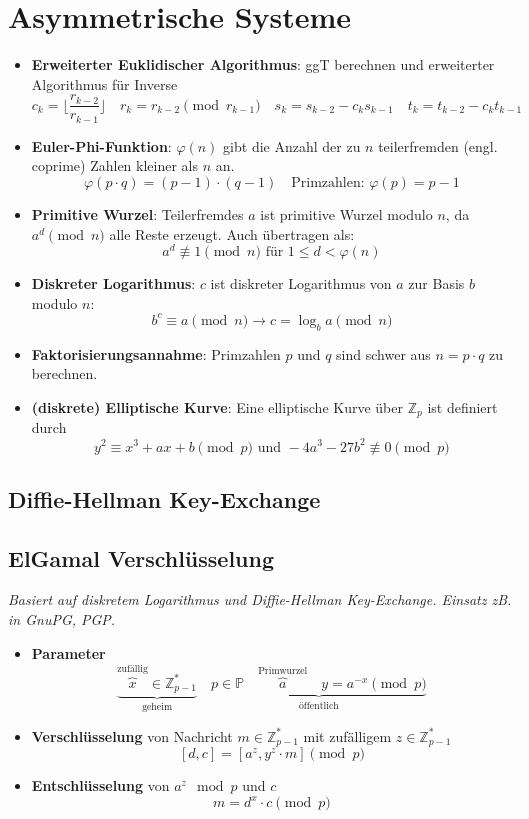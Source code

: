\documentclass{article}
\begin{document}

\section{Asymmetrische Systeme}
\begin{itemize}
  \item \textbf{Erweiterter Euklidischer Algorithmus}: ggT berechnen und erweiterter Algorithmus für Inverse
    \[ c_k=\lfloor\frac{r_{k-2}}{r_{k-1}}\rfloor \quad r_k = r_{k-2} \pmod{r_{k-1}} \quad s_k=s_{k-2}-c_ks_{k-1} \quad t_k=t_{k-2}-c_kt_{k-1} \]
  \item \textbf{Euler-Phi-Funktion}: $\varphi(n)$ gibt die Anzahl der zu $n$ teilerfremden (engl. coprime) Zahlen kleiner als $n$ an.
    \[ \varphi(p \cdot q) = (p-1) \cdot (q-1) \quad \text{Primzahlen: }\varphi(p) = p-1 \]
  \item \textbf{Primitive Wurzel}: Teilerfremdes $a$ ist primitive Wurzel modulo $n$, da $a^d \pmod{n}$ alle Reste erzeugt. Auch übertragen als:
    \[ a^d \not\equiv 1 \pmod{n} \text{ für } 1 \leq d < \varphi(n) \]
  \item \textbf{Diskreter Logarithmus}: $c$ ist diskreter Logarithmus von $a$ zur Basis $b$ modulo $n$:
    \[ b^c \equiv a \pmod{n} \to c = \log_b a \pmod{n} \]
  \item \textbf{Faktorisierungsannahme}: Primzahlen $p$ und $q$ sind schwer aus $n=p \cdot q$ zu berechnen.
  \item \textbf{(diskrete) Elliptische Kurve}: Eine elliptische Kurve über $\mathbb{Z}_p$ ist definiert durch
    \[ y^2 \equiv x^3 + ax + b \pmod{p} \text{ und } -4a^3 - 27b^2 \not\equiv 0 \pmod{p} \]
\end{itemize}

\subsection{Diffie-Hellman Key-Exchange}


\subsection{ElGamal Verschlüsselung}
\textit{Basiert auf diskretem Logarithmus und Diffie-Hellman Key-Exchange. Einsatz zB. in GnuPG, PGP.}
\begin{itemize}
  \item \textbf{Parameter}
    \[
      \underbrace{\overbrace{x}^\text{zufällig}\in\mathbb{Z}^*_{p-1}}_\text{geheim}\quad
      \underbrace{p\in\mathbb{P} \quad \overbrace{a}^\text{Primwurzel} \quad y = a^{-x} \pmod{p}}_\text{öffentlich}
    \]
  \item \textbf{Verschlüsselung} von Nachricht $m\in\mathbb{Z}^*_{p-1}$ mit zufälligem $z\in\mathbb{Z}^*_{p-1}$
    \[ [d,c] = [a^z, y^z \cdot m] \pmod{p} \]
  \item \textbf{Entschlüsselung} von $a^z \mod{p}$ und $c$
    \[ m = d^x \cdot c \pmod{p} \]
\end{itemize}
\end{document}
